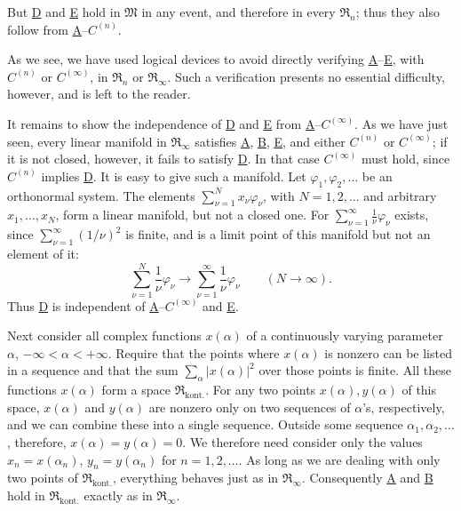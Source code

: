 \documentclass[fontsize=13pt,twoside,openany,headings=normal,parskip=false,bookmarkpackage=false,DIV=calc]{scrbook}
\begin{document}
But \hyperref[ax:II.D]{D} and \hyperref[ax:II.E]{E} hold in $\mathfrak{M}$ in any event, and therefore in every $\mathfrak{R}_n$; thus they also follow from \hyperref[ax:II.A]{A}--\hyperref[ax:II.Cn]{$C^{(n)}$}.

As we see, we have used logical devices to avoid directly verifying \hyperref[ax:II.A]{A}--\hyperref[ax:II.E]{E}, with \hyperref[ax:II.Cn]{$C^{(n)}$} or \hyperref[ax:II.Cinfty]{$C^{(\infty)}$}, in $\mathfrak{R}_n$ or $\mathfrak{R}_\infty$. Such a verification presents no essential difficulty, however, and is left to the reader.

It remains to show the independence of \hyperref[ax:II.D]{D} and \hyperref[ax:II.E]{E} from \hyperref[ax:II.A]{A}--\hyperref[ax:II.Cinfty]{$C^{(\infty)}$}. As we have just seen, every linear manifold in $\mathfrak{R}_\infty$ satisfies \hyperref[ax:II.A]{A}, \hyperref[ax:II.B]{B}, \hyperref[ax:II.E]{E}, and either \hyperref[ax:II.Cn]{$C^{(n)}$} or \hyperref[ax:II.Cinfty]{$C^{(\infty)}$}; if it is not closed, however, it fails to satisfy \hyperref[ax:II.D]{D}. In that case \hyperref[ax:II.Cinfty]{$C^{(\infty)}$} must hold, since \hyperref[ax:II.Cn]{$C^{(n)}$} implies \hyperref[ax:II.D]{D}. It is easy to give such a manifold. Let $\varphi_1,\varphi_2,\ldots$ be an orthonormal system. The elements $\sum_{\nu=1}^N x_\nu\varphi_\nu$, with $N=1,2,\ldots$ and arbitrary $x_1,\ldots,x_N$, form a linear manifold, but not a closed one. For $\sum_{\nu=1}^\infty\frac1\nu\varphi_\nu$ exists, since $\sum_{\nu=1}^\infty(1/\nu)^2$ is finite, and is a limit point of this manifold but not an element of it:
\[
\sum_{\nu=1}^N\frac1\nu\varphi_\nu\longrightarrow\sum_{\nu=1}^\infty\frac1\nu\varphi_\nu\qquad(N\to\infty).
\]
Thus \hyperref[ax:II.D]{D} is independent of \hyperref[ax:II.A]{A}--\hyperref[ax:II.Cinfty]{$C^{(\infty)}$} and \hyperref[ax:II.E]{E}.

Next consider all complex functions $x(\alpha)$ of a continuously varying parameter $\alpha$, $-\infty<\alpha<+\infty$. Require that the points where $x(\alpha)$ is nonzero can be listed in a sequence and that the sum $\sum_\alpha|x(\alpha)|^2$ over those points is finite. All these functions $x(\alpha)$ form a space $\mathfrak{R}_{\mathrm{kont.}}$. For any two points $x(\alpha),y(\alpha)$ of this space, $x(\alpha)$ and $y(\alpha)$ are nonzero only on two sequences of $\alpha$'s, respectively, and we can combine these into a single sequence. Outside some sequence $\alpha_1,\alpha_2,\ldots$, therefore, $x(\alpha)=y(\alpha)=0$. We therefore need consider only the values $x_n=x(\alpha_n)$, $y_n=y(\alpha_n)$ for $n=1,2,\ldots$. As long as we are dealing with only two points of $\mathfrak{R}_{\mathrm{kont.}}$, everything behaves just as in $\mathfrak{R}_\infty$. Consequently \hyperref[ax:II.A]{A} and \hyperref[ax:II.B]{B} hold in $\mathfrak{R}_{\mathrm{kont.}}$ exactly as in $\mathfrak{R}_\infty$.
\end{document}
